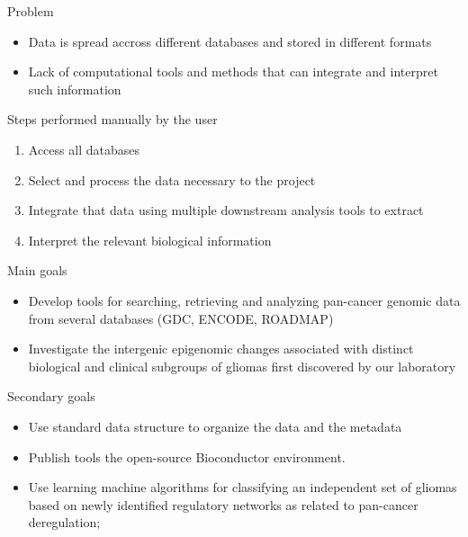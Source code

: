 \documentclass[slidestop,compress,11pt,xcolor=dvipsnames]{beamer}
\begin{document}
\begin{frame}
\begin{alertblock}{Problem}
\begin{itemize}
\item Data is spread accross different databases and stored in different formats
\item Lack of computational tools and methods that can integrate and interpret such information
\end{itemize}
\end{alertblock}
\begin{exampleblock}{Steps performed manually by the user}
\begin{enumerate}
\item Access all databases
\item Select and process the data necessary to the project
\item Integrate that data using multiple downstream analysis tools to extract
\item Interpret the relevant biological information
\end{enumerate}
\end{exampleblock}
\end{frame}


\begin{frame}
\begin{block}{Main goals}
\begin{itemize}
\item Develop tools for searching, retrieving and analyzing pan-cancer genomic data from several databases (GDC, ENCODE, ROADMAP)
  \item Investigate the intergenic epigenomic changes associated with distinct biological and clinical subgroups of gliomas first discovered by our laboratory

\end{itemize}

\end{block}

\begin{block}{Secondary goals}
\begin{itemize}
  \item Use standard data structure to organize the data and the metadata
  \item Publish tools the open-source Bioconductor environment.
  \item Use learning machine algorithms for classifying an independent set of gliomas based on newly identified regulatory networks as related to pan-cancer deregulation;
\end{itemize}

\end{block}


\end{frame}
\end{document}
